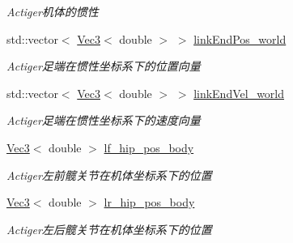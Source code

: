 \begin{DoxyCompactItemize}
\begin{DoxyCompactList}\small\item\em Actiger机体的惯性 \end{DoxyCompactList}\item 
\mbox{\label{classquadruped_1_1RobotModel_ad23ff544cf23a66e388533b39016d677}} 
std\+::vector$<$ \hyperlink{cppTypes_8h_a65c27bf97693676535dd0b30ea0ad399}{Vec3}$<$ double $>$ $>$ \hyperlink{classquadruped_1_1RobotModel_ad23ff544cf23a66e388533b39016d677}{link\+End\+Pos\+\_\+world}
\begin{DoxyCompactList}\small\item\em Actiger足端在惯性坐标系下的位置向量 \end{DoxyCompactList}\item 
\mbox{\label{classquadruped_1_1RobotModel_a25f1136c17f5eed2b66d655b07529150}} 
std\+::vector$<$ \hyperlink{cppTypes_8h_a65c27bf97693676535dd0b30ea0ad399}{Vec3}$<$ double $>$ $>$ \hyperlink{classquadruped_1_1RobotModel_a25f1136c17f5eed2b66d655b07529150}{link\+End\+Vel\+\_\+world}
\begin{DoxyCompactList}\small\item\em Actiger足端在惯性坐标系下的速度向量 \end{DoxyCompactList}\item 
\mbox{\label{classquadruped_1_1RobotModel_adcc66f299c0cd91eaa06cb08934b68bf}} 
\hyperlink{cppTypes_8h_a65c27bf97693676535dd0b30ea0ad399}{Vec3}$<$ double $>$ \hyperlink{classquadruped_1_1RobotModel_adcc66f299c0cd91eaa06cb08934b68bf}{lf\+\_\+hip\+\_\+pos\+\_\+body}
\begin{DoxyCompactList}\small\item\em Actiger左前髋关节在机体坐标系下的位置 \end{DoxyCompactList}\item 
\mbox{\label{classquadruped_1_1RobotModel_acef0a11464e7115dfa0912b8a2d7d5e6}} 
\hyperlink{cppTypes_8h_a65c27bf97693676535dd0b30ea0ad399}{Vec3}$<$ double $>$ \hyperlink{classquadruped_1_1RobotModel_acef0a11464e7115dfa0912b8a2d7d5e6}{lr\+\_\+hip\+\_\+pos\+\_\+body}
\begin{DoxyCompactList}\small\item\em Actiger左后髋关节在机体坐标系下的位置 \end{DoxyCompactList}\item 

\end{DoxyCompactItemize}
